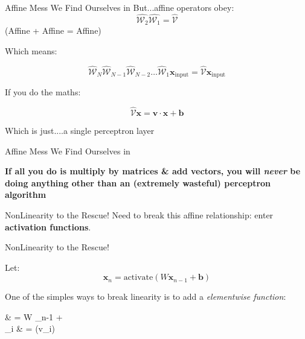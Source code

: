 \documentclass[]{SangerLibrary/sanger-present}
\renewcommand\vec[1]{\boldsymbol{\mathbf{#1}}}
\begin{document}
	\begin{frame}{Affine Mess We Find Ourselves in}
		But...affine operators obey:
		\begin{equation}
			\hat{\mathcal{W}_2} \hat{\mathcal{W}_1} = \hat{\mathcal{V}}
		\end{equation}
		(Affine + Affine = Affine)

		Which means:

		\begin{equation}
			\hat{\mathcal{W}}_N \hat{\mathcal{W}}_{N-1} \hat{\mathcal{W}}_{N-2} \hdots \hat{\mathcal{W}}_{1}  \vec{x}_\text{input}  = \hat{\mathcal{V}} \vec{x}_\text{input} 
		\end{equation}

		\pause If you do the maths:

		\begin{equation}
			\hat{\mathcal{V}} \vec{x}= \vec{v} \cdot \vec{x} + \vec{b} 
		\end{equation}

		\pause Which is just....a single perceptron layer
	\end{frame}

	\begin{frame}{Affine Mess We Find Ourselves in}

		\begin{center}
			\bf If all you do is multiply by matrices \& add vectors, you will \textit{never} be doing anything other than an (extremely wasteful) perceptron algorithm
		\end{center}
		
	\end{frame}

	\begin{frame}{NonLinearity to the Rescue!}
		Need to break this affine relationship: enter \textbf{activation functions}.

	\end{frame}

	\begin{frame}{NonLinearity to the Rescue!}
	
		Let:
		\begin{equation}
			\vec{x}_n = \text{activate}\left(W \vec{x}_{n-1} + \vec{b} \right)
		\end{equation}
		
		\vspace{1cm}

		\pause One of the simples ways to break linearity is to add a \textit{elementwise function}:

		\begin{spalign}
			\vec{v} & = W \vec{x}_{n-1} + \vec{b}
			\\
			[\vec{x}_n]_i & = \sigma(v_i)
		\end{spalign}
		
	\end{frame}
\end{document}
